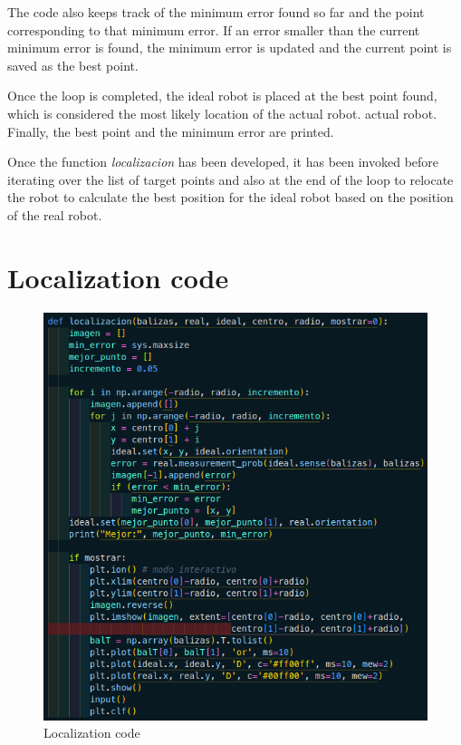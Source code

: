 \documentclass[11pt]{report}
\begin{document}
The code also keeps track of the minimum error found so far and the point corresponding to that minimum error. If an error smaller than the current minimum error is found, the minimum error is updated and the current point is saved as the best point.

Once the loop is completed, the ideal robot is placed at the best point found, which is considered the most likely location of the actual robot. 
actual robot. Finally, the best point and the minimum error are printed.

Once the function \emph{localizacion} has been developed, it has been invoked before iterating over the list of target points and also at the end of the loop 
to relocate the robot to calculate the best position for the ideal robot based on the position of the real robot.

\newpage

\section{Localization code}

\begin{figure}[H]
  \centering
  \includegraphics[scale=0.42]{img/localizacion.png}
  \caption{Localization code}
\end{figure}
\end{document}
